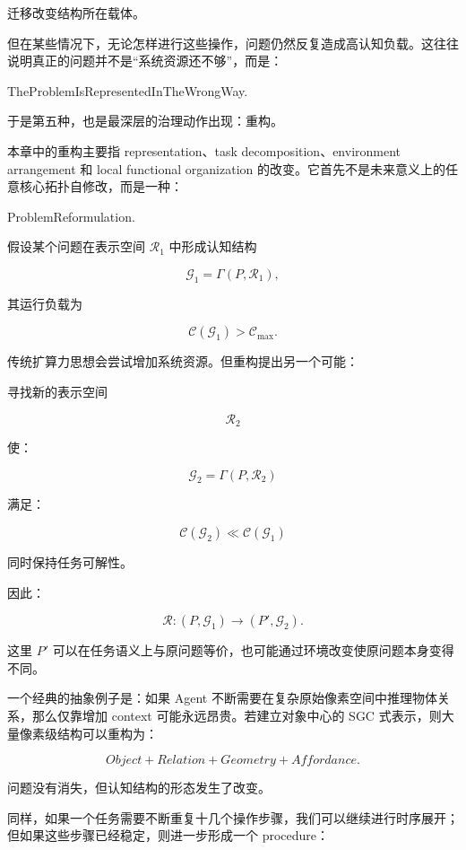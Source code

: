 迁移改变结构所在载体。

但在某些情况下，无论怎样进行这些操作，问题仍然反复造成高认知负载。这往往说明真正的问题并不是“系统资源还不够”，而是：

\begin{statementbox}
TheProblemIsRepresentedInTheWrongWay.
\end{statementbox}

于是第五种，也是最深层的治理动作出现：重构。

本章中的重构主要指 representation、task decomposition、environment arrangement 和 local functional organization 的改变。它首先不是未来意义上的任意核心拓扑自修改，而是一种：

\begin{statementbox}
ProblemReformulation.
\end{statementbox}

假设某个问题在表示空间 $\mathcal R_1$ 中形成认知结构

\[
\mathcal G_1
=
\Gamma(P,\mathcal R_1),
\]

其运行负载为

\[
\mathcal C(\mathcal G_1)
>
\mathcal C_{\max}.
\]

传统扩算力思想会尝试增加系统资源。但重构提出另一个可能：

寻找新的表示空间

\[
\mathcal R_2
\]

使：

\[
\mathcal G_2
=
\Gamma(P,\mathcal R_2)
\]

满足：

\[
\boxed{
\mathcal C(\mathcal G_2)
\ll
\mathcal C(\mathcal G_1)
}
\]

同时保持任务可解性。

因此：

\[
\mathcal R:
(P,\mathcal G_1)
\rightarrow
(P',\mathcal G_2).
\]

这里 $P'$ 可以在任务语义上与原问题等价，也可能通过环境改变使原问题本身变得不同。

一个经典的抽象例子是：如果 Agent 不断需要在复杂原始像素空间中推理物体关系，那么仅靠增加 context 可能永远昂贵。若建立对象中心的 SGC 式表示，则大量像素级结构可以重构为：

\[
Object
+
Relation
+
Geometry
+
Affordance.
\]

问题没有消失，但认知结构的形态发生了改变。

同样，如果一个任务需要不断重复十几个操作步骤，我们可以继续进行时序展开；但如果这些步骤已经稳定，则进一步形成一个 procedure：

